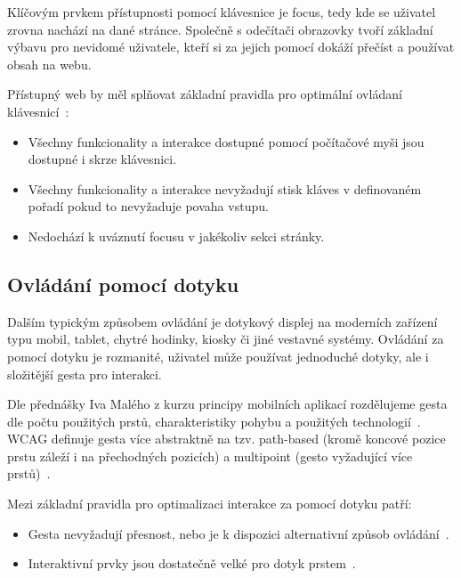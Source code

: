 
Klíčovým prvkem přístupnosti pomocí klávesnice je focus, tedy kde se uživatel zrovna nachází na dané stránce.
Společně s odečítači obrazovky tvoří základní výbavu pro nevidomé uživatele, kteří si za jejich pomocí dokáží přečíst a používat obsah na webu.

Přístupný web by měl splňovat základní pravidla pro optimální ovládaní klávesnicí~\cite{wcag-keyboard}:

\begin{itemize}
    \item Všechny funkcionality a interakce dostupné pomocí počítačové myši jsou dostupné i skrze klávesnici.
    \item Všechny funkcionality a interakce nevyžadují stisk kláves v definovaném pořadí pokud to nevyžaduje povaha vstupu.
    \item Nedochází k uváznutí focusu v jakékoliv sekci stránky.
\end{itemize}

\subsection{Ovládání pomocí dotyku}

Dalším typickým způsobem ovládání je dotykový displej na moderních zařízení typu mobil, tablet, chytré hodinky, kiosky či jiné vestavné systémy.
Ovládání za pomocí dotyku je rozmanité, uživatel může používat jednoduché dotyky, ale i složitější gesta pro interakci.


Dle přednášky Iva Malého z kurzu principy mobilních aplikací rozdělujeme gesta dle počtu použitých prstů, charakteristiky pohybu a použitých technologií~\cite{ctu-pda-11}.
WCAG definuje gesta více abstraktně na tzv. path-based (kromě koncové pozice prstu záleží i na přechodných pozicích) a multipoint (gesto vyžadující více prstů)~\cite{wcag-pointer-gestures}.

Mezi základní pravidla pro optimalizaci interakce za pomocí dotyku patří:

\begin{itemize}
    \item Gesta nevyžadují přesnost, nebo je k dispozici alternativní způsob ovládání~\cite{wcag-pointer-gestures}.
    \item Interaktivní prvky jsou dostatečně velké pro dotyk prstem~\cite{wcag-target-size}.
\end{itemize}

